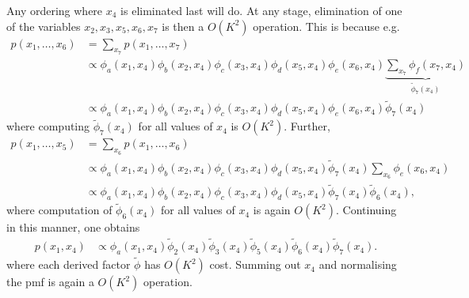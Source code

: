 \begin{exenumerate}
\begin{solution}
    Any ordering where $x_4$ is eliminated last will do. At any stage,
    elimination of one of the variables $x_2, x_3, x_5, x_6, x_7$ is
    then a $O(K^2)$ operation. This is because e.g.\
  \begin{align}
    p(x_1, \ldots, x_6) & = \sum_{x_7} p(x_1, \ldots, x_7)\\
    & \propto \phi_a(x_1,x_4)\phi_b(x_2,x_4)\phi_c(x_3,x_4)\phi_d(x_5,x_4)\phi_e(x_6,x_4) \underbrace{\sum_{x_7} \phi_f(x_7,x_4)}_{\tilde{\phi}_7(x_4)}\\
    & \propto \phi_a(x_1,x_4)\phi_b(x_2,x_4)\phi_c(x_3,x_4)\phi_d(x_5,x_4)\phi_e(x_6,x_4) \tilde{\phi}_7(x_4)
  \end{align}
  where computing $\tilde{\phi}_7(x_4)$ for all values of $x_4$ is $O(K^2)$. Further,
  \begin{align}
    p(x_1, \ldots, x_5) & = \sum_{x_6} p(x_1, \ldots, x_6)\\
    & \propto \phi_a(x_1,x_4)\phi_b(x_2,x_4)\phi_c(x_3,x_4)\phi_d(x_5,x_4) \tilde{\phi}_7(x_4) \sum_{x_6}\phi_e(x_6,x_4)\\
    & \propto \phi_a(x_1,x_4)\phi_b(x_2,x_4)\phi_c(x_3,x_4)\phi_d(x_5,x_4) \tilde{\phi}_7(x_4) \tilde{\phi}_6(x_4), 
  \end{align}
  where computation of $\tilde{\phi}_6(x_4)$ for all values of $x_4$ is again $O(K^2)$. Continuing in this manner, one obtains
  \begin{align}
    p(x_1, x_4) &\propto \phi_a(x_1,x_4) \tilde{\phi}_2(x_4)\tilde{\phi}_3(x_4)\tilde{\phi}_5(x_4)\tilde{\phi}_6(x_4)\tilde{\phi}_7(x_4).
  \end{align}
  where each derived factor $\tilde{\phi}$ has $O(K^2)$ cost. Summing out $x_4$ and normalising the pmf is again a $O(K^2)$ operation.
  \end{solution}
  
\end{exenumerate}

